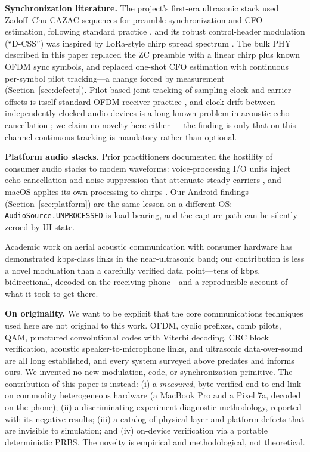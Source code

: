 \documentclass[11pt]{article}
\begin{document}
\textbf{Synchronization literature.} The project's first-era ultrasonic stack used
Zadoff--Chu CAZAC sequences for preamble synchronization and CFO estimation,
following standard practice \cite{cazac,zcfo}, and its robust control-header
modulation (``D-CSS'') was inspired by LoRa-style chirp spread spectrum
\cite{lora}. The bulk PHY described in this paper replaced the ZC preamble
with a linear chirp plus known OFDM sync symbols, and replaced one-shot CFO
estimation with continuous per-symbol pilot tracking---a change forced by
measurement (Section~\ref{sec:defects}). Pilot-based joint tracking of
sampling-clock and carrier offsets is itself standard OFDM receiver practice
\cite{sfotrack,sfopatent}, and clock drift between independently clocked audio
devices is a long-known problem in acoustic echo cancellation \cite{aecdrift};
we claim no novelty here either --- the finding is only that on this channel
continuous tracking is mandatory rather than optional.

\textbf{Platform audio stacks.} Prior practitioners documented the hostility
of consumer audio stacks to modem waveforms: voice-processing I/O units inject
echo cancellation and noise suppression that attenuate steady carriers
\cite{vpio,echocancel}, and macOS applies its own processing to chirps
\cite{choi}. Our Android findings (Section~\ref{sec:platform}) are the same
lesson on a different OS: \texttt{AudioSource.UNPROCESSED} is load-bearing,
and the capture path can be silently zeroed by UI state.

Academic work on aerial acoustic communication with consumer hardware
\cite{researchgate} has demonstrated kbps-class links in the near-ultrasonic
band; our contribution is less a novel modulation than a carefully verified
data point---tens of kbps, bidirectional, decoded on the receiving phone---and
a reproducible account of what it took to get there.

\textbf{On originality.} We want to be explicit that the core communications
techniques used here are not original to this work. OFDM, cyclic prefixes,
comb pilots, QAM, punctured convolutional codes with Viterbi decoding, CRC
block verification, acoustic speaker-to-microphone links, and ultrasonic
data-over-sound are all long established, and every system surveyed above
predates and informs ours. We invented no new modulation, code, or
synchronization primitive. The contribution of this paper is instead: (i) a
\emph{measured}, byte-verified end-to-end link on commodity heterogeneous
hardware (a MacBook Pro and a Pixel 7a, decoded on the phone); (ii) a
discriminating-experiment diagnostic methodology, reported with its negative
results; (iii) a catalog of physical-layer and platform defects that are
invisible to simulation; and (iv) on-device verification via a portable
deterministic PRBS. The novelty is empirical and methodological, not
theoretical.
\end{document}

